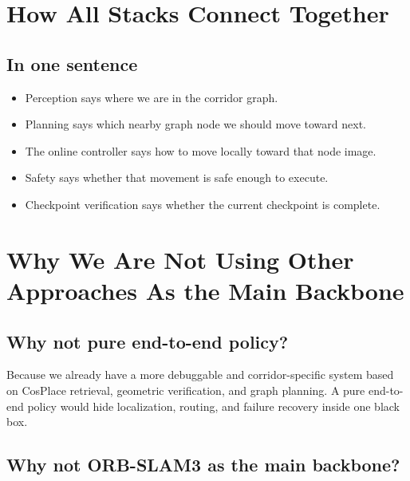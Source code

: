 \documentclass[11pt,a4paper]{article}
\begin{document}
\section{How All Stacks Connect Together}

\begin{center}
\end{center}

\subsection*{In one sentence}

\begin{itemize}[nosep]
  \item Perception says where we are in the corridor graph.
  \item Planning says which nearby graph node we should move toward next.
  \item The online controller says how to move locally toward that node image.
  \item Safety says whether that movement is safe enough to execute.
  \item Checkpoint verification says whether the current checkpoint is complete.
\end{itemize}


\section{Why We Are Not Using Other Approaches As the Main Backbone}

\subsection*{Why not pure end-to-end policy?}

Because we already have a more debuggable and corridor-specific system based on
CosPlace retrieval, geometric verification, and graph planning. A pure end-to-end
policy would hide localization, routing, and failure recovery inside one black box.

\subsection*{Why not ORB-SLAM3 as the main backbone?}
\end{document}
